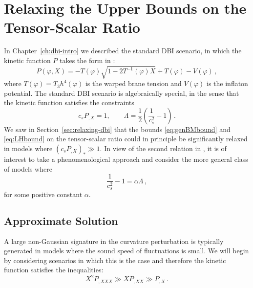 \section{Relaxing the Upper Bounds on the Tensor-Scalar Ratio}
\label{sec:relaxing-multi}
% 
In Chapter~\ref{ch:dbi-intro} we described the standard DBI scenario, in
which the kinetic function $P$ takes the form in :
%  
\begin{equation}
\label{eq:DBIkinetic}
P (\varphi , X) = -T(\varphi ) \sqrt{1-2T^{-1}(\varphi ) X} + T(\varphi ) - V(\varphi ) \,,
\end{equation}
% 
where $T(\varphi ) = T_3 h^4 (\varphi )$ 
is the warped brane tension and  $V(\varphi )$ is the 
inflaton potential. The standard DBI scenario is
algebraically special, 
in the sense that the kinetic function satisfies the constraints 
% 
\begin{equation}
\label{eq:cspx1}
c_s P_{,X} = 1 , \qquad  \Lambda = \frac{1}{2} \left( 
\frac{1}{c_s^2} -1 \right) \,.
\end{equation}
% 
We saw in Section~\ref{sec:relaxing-dbi} that the 
bounds \eqref{eq:genBMbound} and \eqref{eq:LHbound} 
on the tensor-scalar ratio could in principle be 
significantly relaxed in models where $(c_sP_{,X})_* \gg 1$. 
In view of the second relation in , it is of interest 
to take a phenomenological approach and consider the more  
general class of models where
%  
\begin{equation}
\label{eq:defalpha}
\frac{1}{c_s^2} -1 = \alpha \Lambda \,,
\end{equation}
% 
for some positive constant $\alpha$. 

\subsection{Approximate Solution}
\label{sec:approx-multi}
A large non-Gaussian signature in the curvature perturbation is 
typically generated in models where the sound speed of fluctuations 
is small. We will begin by considering 
scenarios in which this is the case and therefore the kinetic function satisfies
the inequalities: 
% 
\begin{equation}
\label{eq:Plimits}
X^2 P_{,XXX} \gg XP_{,XX} \gg P_{,X} \,.
\end{equation}
% 


